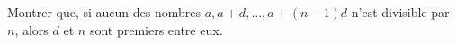 Montrer que, si aucun des nombres $a, a + d, \ldots, a + (n - 1)d$ n'est divisible par $n$, alors $d$ et $n$ sont premiers entre eux.
